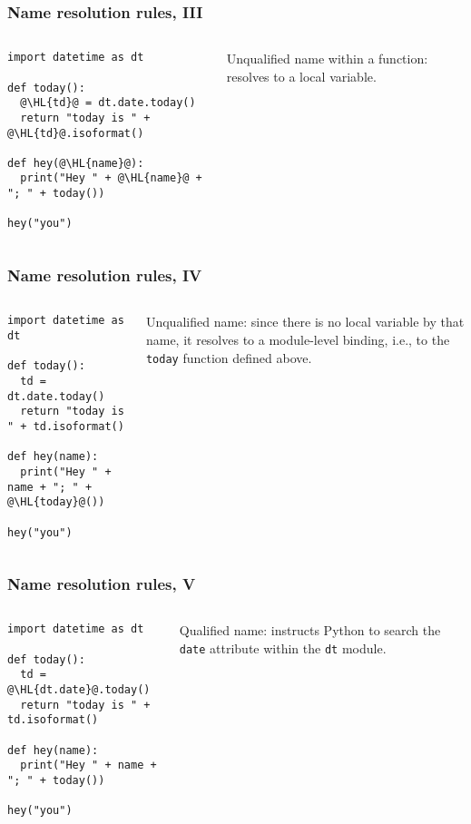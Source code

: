 \documentclass[english,serif,mathserif,xcolor=pdftex,dvipsnames,table]{beamer}
\begin{document}
\begin{frame}[fragile]
  \frametitle{Name resolution rules, III}
  \begin{columns}
    \begin{column}[t]{0.6\linewidth}
\begin{lstlisting}
import datetime as dt

def today():
  @\HL{td}@ = dt.date.today()
  return "today is " + @\HL{td}@.isoformat()

def hey(@\HL{name}@):
  print("Hey " + @\HL{name}@ + "; " + today())

hey("you")
\end{lstlisting}
    \end{column}
    \begin{column}[t]{0.4\linewidth}
      \raggedleft
      Unqualified name within a function: resolves to a local variable.
    \end{column}
  \end{columns}
\end{frame}


\begin{frame}[fragile]
  \frametitle{Name resolution rules, IV}
  \begin{columns}
    \begin{column}[t]{0.6\linewidth}
\begin{lstlisting}
import datetime as dt

def today():
  td = dt.date.today()
  return "today is " + td.isoformat()

def hey(name):
  print("Hey " + name + "; " + @\HL{today}@())

hey("you")
\end{lstlisting}
    \end{column}
    \begin{column}[t]{0.4\linewidth}
      \raggedleft
      Unqualified name: since there is no local variable by that name,
      it resolves to a module-level binding, i.e., to the
      \texttt{today} function defined above.
    \end{column}
  \end{columns}
\end{frame}


\begin{frame}[fragile]
  \frametitle{Name resolution rules, V}
  \begin{columns}
    \begin{column}[t]{0.6\linewidth}
\begin{lstlisting}
import datetime as dt

def today():
  td = @\HL{dt.date}@.today()
  return "today is " + td.isoformat()

def hey(name):
  print("Hey " + name + "; " + today())

hey("you")
\end{lstlisting}
    \end{column}
    \begin{column}[t]{0.4\linewidth}
      \raggedleft
      Qualified name: instructs Python to search the
      \texttt{date} attribute within the \texttt{dt} module.
    \end{column}
  \end{columns}
\end{frame}
\end{document}
